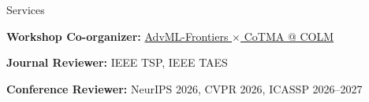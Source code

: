 
\begin{rSection}{Services}
    
     \small{{\bf Workshop Co-organizer:} \href{https://advml-frontier.github.io/}{\textcolor{BS_color}{AdvML-Frontiers $\times$ CoTMA @ COLM}}}

     \small{{\bf Journal Reviewer:} IEEE TSP, IEEE TAES}

     \small{{\bf Conference Reviewer:} NeurIPS 2026, CVPR 2026, ICASSP 2026--2027}
  


    \end{rSection}